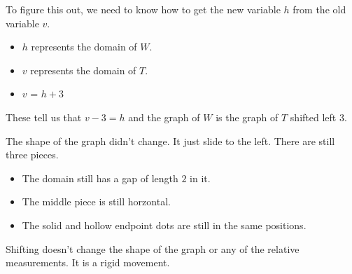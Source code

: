 \documentclass{ximera}
\begin{document}
\begin{example}
To figure this out, we need to know how to get the new variable $h$ from the old variable $v$. \\




\begin{itemize}
\item $h$ represents the domain of $W$. 
\item $v$ represents the domain of $T$.  
\item $v$ = $h+3$
\end{itemize}


These tell us that $v-3 = h$ and the graph of $W$ is the graph of $T$ shifted left $3$.



\end{example}


The shape of the graph didn't change. It just slide to the left. There are still three pieces. \\




\begin{itemize}
\item The domain still has a gap of length $2$ in it.  
\item The middle piece is still horzontal.  
\item The solid and hollow endpoint dots are still in the same positions. 
\end{itemize}





Shifting doesn't change the shape of the graph or any of the relative measurements. It is a rigid movement.
\end{document}

